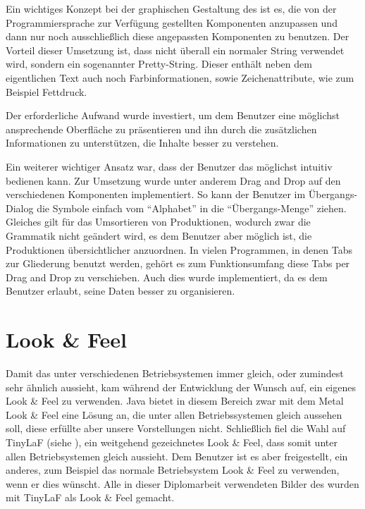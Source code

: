 Ein wichtiges Konzept bei der graphischen Gestaltung des \gtitool ist es, die von
der Programmiersprache zur Verfügung gestellten Komponenten anzupassen und dann
nur noch ausschließlich diese angepassten Komponenten zu benutzen. Der Vorteil
dieser Umsetzung ist, dass nicht überall ein normaler String verwendet wird,
sondern ein sogenannter Pretty-String. Dieser enthält neben dem eigentlichen
Text auch noch Farbinformationen, sowie Zeichenattribute, wie zum Beispiel
Fettdruck.\vspace{10pt}

Der erforderliche Aufwand wurde investiert, um dem Benutzer eine möglichst
ansprechende Oberfläche zu präsentieren und ihn durch die zusätzlichen
Informationen zu unterstützen, die Inhalte besser zu verstehen.\vspace{10pt}

Ein weiterer wichtiger Ansatz war, dass der Benutzer das \gtitool möglichst
intuitiv bedienen kann. Zur Umsetzung wurde unter anderem Drag and Drop auf den
verschiedenen Komponenten implementiert. So kann der Benutzer im Übergangs-Dialog
die Symbole einfach vom "`Alphabet"' in die "`Übergangs-Menge"' ziehen. Gleiches
gilt für das Umsortieren von Produktionen, wodurch zwar die Grammatik nicht
geändert wird, es dem Benutzer aber möglich ist, die Produktionen übersichtlicher
anzuordnen. In vielen Programmen, in denen Tabs zur Gliederung benutzt werden,
gehört es zum Funktionsumfang diese Tabs per Drag and Drop zu verschieben. Auch
dies wurde implementiert, da es dem Benutzer erlaubt, seine Daten besser zu
organisieren.\vspace{10pt}


\section{Look \& Feel}\label{LookAndFeel}

Damit das \gtitool unter verschiedenen Betriebsystemen immer gleich, oder
zumindest sehr ähnlich aussieht, kam während der Entwicklung der Wunsch auf, ein
eigenes Look \& Feel zu verwenden. Java bietet in diesem Bereich zwar mit dem
Metal Look \& Feel eine Lösung an, die unter allen Betriebssystemen gleich
aussehen soll, diese erfüllte aber unsere Vorstellungen nicht. Schließlich fiel
die Wahl auf TinyLaF (siehe \cite{tinylaf}), ein weitgehend gezeichnetes
Look \& Feel, dass somit unter allen Betriebsystemen gleich aussieht. Dem
Benutzer ist es aber freigestellt, ein anderes, zum Beispiel das normale
Betriebsystem Look \& Feel zu verwenden, wenn er dies wünscht. Alle in dieser
Diplomarbeit verwendeten Bilder des \gtitools wurden mit TinyLaF als Look \&
Feel gemacht.\vspace{10pt}


